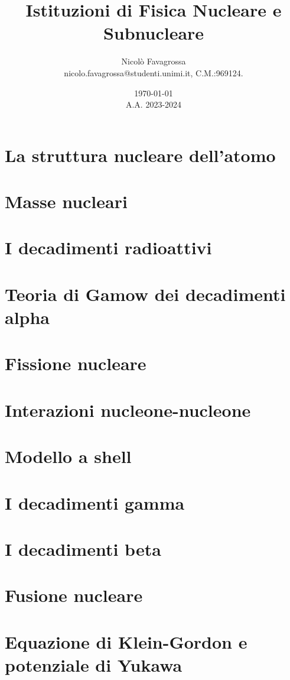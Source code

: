 \documentclass[11pt]{article}
\title{Istituzioni di Fisica Nucleare e Subnucleare}
\author{Nicolò Favagrossa\\nicolo.favagrossa@studenti.unimi.it, C.M.:969124.}
\date{\today\\A.A. 2023-2024}
\begin{document}
\maketitle
\tableofcontents
\newpage
\section{La struttura nucleare dell'atomo}

\section{Masse nucleari}

\section{I decadimenti radioattivi}

\section{Teoria di Gamow dei decadimenti alpha}

\section{Fissione nucleare}

\section{Interazioni nucleone-nucleone}

\section{Modello a shell}

\section{I decadimenti gamma}

\section{I decadimenti beta}

\section{Fusione nucleare}

\section{Equazione di Klein-Gordon e potenziale di Yukawa}

\end{document}
